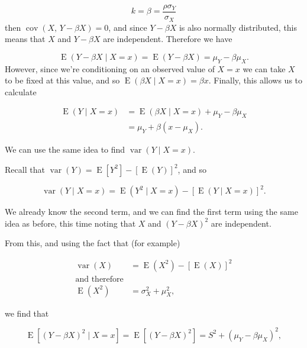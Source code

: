 \documentclass[
  openany]{book}
\theoremstyle{definition}
\theoremstyle{definition}
\theoremstyle{definition}
\theoremstyle{definition}
\theoremstyle{remark}
\begin{document}
\[k = \beta = \frac{\rho\sigma_Y}{\sigma_X} \]
then \(\operatorname{cov}\left(X,\,Y-\beta X\right)=0\), and since \(Y-\beta X\) is also normally distributed, this means that \(X\) and \(Y-\beta X\) are independent. Therefore we have

\[\operatorname{E}\left(Y-\beta X \mid X=x\right) = \operatorname{E}\left(Y-\beta X\right) = \mu_Y - \beta \mu_X.\]
However, since we're conditioning on an observed value of \(X=x\) we can take \(X\) to be fixed at this value, and so \(\operatorname{E}\left(\beta X\mid{X=x}\right) = \beta x\). Finally, this allows us to calculate

\[
\begin{aligned}
\operatorname{E}\left(Y\mid{X=x}\right) & = \operatorname{E}\left(\beta X\mid{X=x}\right) + \mu_Y - \beta\mu_X\\
& = \mu_Y + \beta\left(x - \mu_X\right).
\end{aligned}
\]

We can use the same idea to find \(\operatorname{var}\left(Y\mid{X=x}\right)\).

Recall that \(\operatorname{var}\left(Y\right) = \operatorname{E}\left[Y^2\right] - \left[\operatorname{E}\left(Y\right)\right]^2\), and so

\begin{equation}
\operatorname{var}\left(Y\mid{X=x}\right) = \operatorname{E}\left(Y^2\mid{X=x}\right) - \left[\operatorname{E}\left(Y\mid{X=x}\right)\right]^2. 
\label{eq:vary2}
\end{equation}

We already know the second term, and we can find the first term using the same idea as before, this time noting that \(X\) and \(\left(Y-\beta X\right)^2\) are independent.

From this, and using the fact that (for example)

\[
\begin{aligned}
\operatorname{var}\left(X\right) & = \operatorname{E}\left(X^2\right) - \left[\operatorname{E}\left(X\right)\right]^2\\
\text{and therefore} & \\
\operatorname{E}\left(X^2\right)  &= \sigma_X^2 + \mu_X^2,
\end{aligned}
\]

we find that

\begin{equation}
\operatorname{E}\left[\left(Y-\beta X\right)^2 \mid X=x\right] = \operatorname{E}\left[\left(Y-\beta X\right)^2\right] =S^2 + \left(\mu_Y - \beta \mu_X\right)^2,
\label{eq:evary1}
\end{equation}
\end{document}
